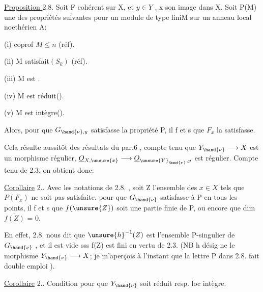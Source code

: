 
\uline{Proposition }2.8.  Soit F cohérent sur X, et  $y\in Y$ , x son image
dans X.   Soit P(M) une des propriétés suivantes pour
un module de type finiM sur un anneau local noethérien A:

(i)   coprof $M\leqslant n$   (réf).

(ii)  M satisfait$(S_k)$  (réf).

(iii)  M est .

(iv)  M est réduit().

(v)   M est intègre().

Alors, pour que $G_{\hand{\nu},y}$ satisfasse la propriété P, il f et s que $F_x$ la
satisfasse.

Cela résulte aussitôt des résultats du par.6 , compte tenu que
 $Y_{\hand{\nu}}\longrightarrow X$  est un morphisme régulier,   $\underline{O}_{X,\unsure{x}}\longrightarrow \underline{O}_{\unsure{Y}_{\hand{\nu}},y}$ est
régulier.  Compte tenu de 2.3. on obtient donc:

\uline{Corollaire} 2..  Avec les notations de 2.8. , soit Z l'ensemble
des $x\in X$ tels que $P(F_x)$ ne soit pas satisfaite.  pour que
$G_{\hand{\nu}}$ satisfasse à P en tous les points, il f et s que $f(\unsure{Z})$ soit une
partie finie de P, ou encore que  dim $\overline{f(Z)}$ = 0.

En effet, 2.8. nous dit que $\unsure{h}^{-1}(Z)$ est l'ensemble P-singulier
de $G_{\hand{\nu}}$ , et il est vide sss f(Z) est fini en vertu de 2.3. (NB h désig
\placedmargin{|} ne le morphisme $Y_{\hand{\nu}}\longrightarrow X$; je m'aperçois à l'instant que la lettre P
\placedmargin{|} dans 2.8. fait double emploi ).

\placedmargin{|} \uline{Corollaire} 2..  Condition pour que $Y_{\hand{\nu}}$ soit réduit resp. loc intègre.



